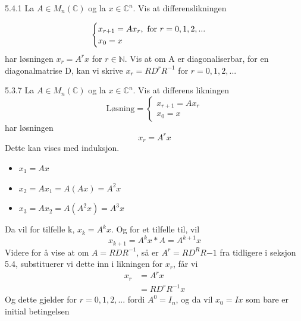 \documentclass[a4paper,norsk]{article}
\begin{document}
\begin{oppgavebox}{5.4.1}{}
La $ A \in M_n ( \mathbb{C}) $ og la $ x \in \mathbb{C}^n $. Vis at differenslikningen 

\[
    \begin{cases}
        x_{r+1} = A x_r, \text{ for $ r=0, 1, 2, ... $ }\\
        x_0 = x
    \end{cases}
\]
har løsningen $ x_r = A^r x $ for  $ r \in \mathbb{N} $. Vis at om A er diagonaliserbar, for en diagonalmatrise D, kan vi skrive $ x_r = RD^r R^{-1} $ for $ r=0, 1, 2,... $  

\begin{proofbox}{5.3.7}{}
La $ A \in M_n(\mathbb{C}) $ og la $ x \in \mathbb{C}^n $. Vis at differens likningen
\[
    \text{Løsning} = \begin{cases}
        x_{r+1} = Ax_r\\
        x_0 = x
    \end{cases}
\]
har løsningen 
\[
    x_r = A^r x
\]
Dette kan vises med induksjon. 
\begin{itemize}
    \item $ x_1 = Ax $ 
    \item $ x_2 = Ax_1 = A(Ax) = A^2x $
    \item $ x_3 = Ax_2 = A(A^2x) = A^3x $   
\end{itemize}
Da vil for tilfelle k, $ x_k = A^kx $. Og for et tilfelle til, vil 
\[
    x_{k+1} = A^k x * A = A^{k+1}x
\]
Videre for å vise at om $ A = RDR^{-1} $, så er $ A^r= RD^RR{-1} $ fra tidligere i seksjon 5.4, substituerer vi dette inn i likningen for $ x_r $, får vi
\begin{align*}
    x_r &= A^rx\\
    &= RD^rR^{-1}x
\end{align*}
Og dette gjelder for $ r=0, 1, 2,... $ fordi $ A^0=I_n $, og da vil $ x_0 = Ix $ som bare er initial betingelsen 
\end{proofbox}
\end{oppgavebox}
\end{document}
